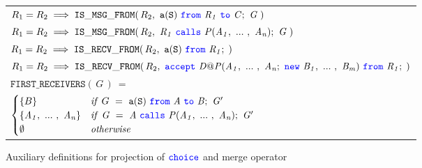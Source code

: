 \documentclass[12pt,twoside]{report}
\begin{document}
\begin{figure}[h!]
    \begin{center}
        \begin{tabular}{l}






            $R_1 = R_2 \implies \mathtt{IS\_MSG\_FROM}(\,R_2,\ \contG{\messageG{a}{S}{R_1}{C}}{G}\;)$\\[7pt]

            $R_1 = R_2 \implies \mathtt{IS\_MSG\_FROM}(\,R_2,\ \contG{\callsG{R_1}{P}{A}}{G}\;)$\\[14pt]

            $R_1 = R_2 \implies \mathtt{IS\_RECV\_FROM}(\,R_2,\ \messageFromL{a}{S}{R_1};\;)$\\[7pt]

            $R_1 = R_2 \implies \mathtt{IS\_RECV\_FROM}(\,R_2,\ \acceptL{D@P}{A}{B}{R_1};\;)$\\[14pt]

            $\mathtt{FIRST\_RECEIVERS}(\,G\,)\ =$\\

            \begin{math}
                \begin{cases}
                    \{B\} & \mathit{if}\ G\ =\ \scrmessage{a}{S}\ \from\ \mathit{A}\ \scrto\ \mathit{B};\ \mathit{G'}\\
                    \{\roles{A}{n}\} & \mathit{if}\ \mathit{G}\ =\ \mathit{A}\ \calls\ \mathit{P}(\roles{A}{n});\ \mathit{G'}\\
                    \emptyset & \mathit{otherwise}
                \end{cases}
            \end{math}
        \end{tabular}
    \end{center}
    \caption{Auxiliary definitions for projection of ${\color{blue}\mathtt{choice}}$ and merge operator}
    \label{scribble-choice-aux-predicates}
\end{figure}
\end{document}
